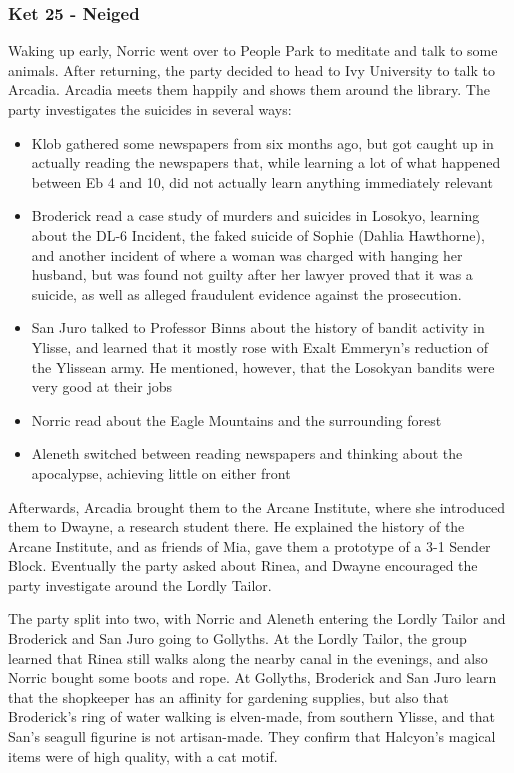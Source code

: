 \subsubsection{Ket 25 - Neiged}
Waking up early, Norric went over to People Park to meditate and talk to some animals. After returning, the party decided to head to Ivy University to talk to Arcadia. Arcadia meets them happily and shows them around the library. The party investigates the suicides in several ways:
\begin{itemize}
\item Klob gathered some newspapers from six months ago, but got caught up in actually reading the newspapers that, while learning a lot of what happened between Eb 4 and 10, did not actually learn anything immediately relevant
\item Broderick read a case study of murders and suicides in Losokyo, learning about the DL-6 Incident, the faked suicide of Sophie (Dahlia Hawthorne), and another incident of where a woman was charged with hanging her husband, but was found not guilty after her lawyer proved that it was a suicide, as well as alleged fraudulent evidence against the prosecution.
\item San Juro talked to Professor Binns about the history of bandit activity in Ylisse, and learned that it mostly rose with Exalt Emmeryn's reduction of the Ylissean army. He mentioned, however, that the Losokyan bandits were very good at their jobs
\item Norric read about the Eagle Mountains and the surrounding forest
\item Aleneth switched between reading newspapers and thinking about the apocalypse, achieving little on either front
\end{itemize}
Afterwards, Arcadia brought them to the Arcane Institute, where she introduced them to Dwayne, a research student there. He explained the history of the Arcane Institute, and as friends of Mia, gave them a prototype of a 3-1 Sender Block. Eventually the party asked about Rinea, and Dwayne encouraged the party investigate around the Lordly Tailor.

The party split into two, with Norric and Aleneth entering the Lordly Tailor and Broderick and San Juro going to Gollyths. At the Lordly Tailor, the group learned that Rinea still walks along the nearby canal in the evenings, and also Norric bought some boots and rope. At Gollyths, Broderick and San Juro learn that the shopkeeper has an affinity for gardening supplies, but also that Broderick's ring of water walking is elven-made, from southern Ylisse, and that San's seagull figurine is not artisan-made. They confirm that Halcyon's magical items were of high quality, with a cat motif. 